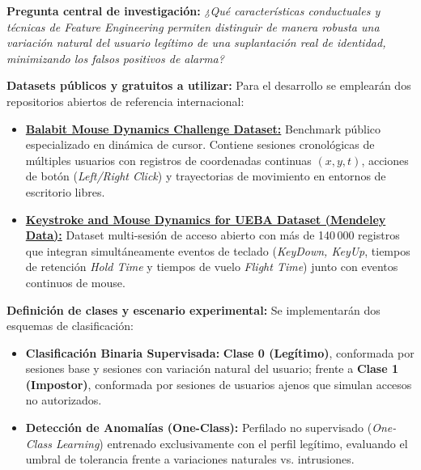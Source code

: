 \documentclass[10pt,letterpaper]{article}
\begin{document}
\textbf{Pregunta central de investigación:} \textit{¿Qué características conductuales y técnicas de Feature Engineering permiten distinguir de manera robusta una variación natural del usuario legítimo de una suplantación real de identidad, minimizando los falsos positivos de alarma?}

\textbf{Datasets públicos y gratuitos a utilizar:}
Para el desarrollo se emplearán dos repositorios abiertos de referencia internacional:
\begin{itemize}
    \item \href{https://github.com/balabit/Mouse-Dynamics-Challenge}{\textbf{Balabit Mouse Dynamics Challenge Dataset:}} Benchmark público especializado en dinámica de cursor. Contiene sesiones cronológicas de múltiples usuarios con registros de coordenadas continuas $(x, y, t)$, acciones de botón (\textit{Left/Right Click}) y trayectorias de movimiento en entornos de escritorio libres.
    \item \href{https://data.mendeley.com/datasets/f78jsh6zp9/2}{\textbf{Keystroke and Mouse Dynamics for UEBA Dataset (Mendeley Data):}} Dataset multi-sesión de acceso abierto con más de 140\,000 registros que integran simultáneamente eventos de teclado (\textit{KeyDown, KeyUp}, tiempos de retención \textit{Hold Time} y tiempos de vuelo \textit{Flight Time}) junto con eventos continuos de mouse.
\end{itemize}

\textbf{Definición de clases y escenario experimental:} Se implementarán dos esquemas de clasificación:
\begin{itemize}
    \item \textbf{Clasificación Binaria Supervisada:} \textbf{Clase 0 (Legítimo)}, conformada por sesiones base y sesiones con variación natural del usuario; frente a \textbf{Clase 1 (Impostor)}, conformada por sesiones de usuarios ajenos que simulan accesos no autorizados.
    \item \textbf{Detección de Anomalías (One-Class):} Perfilado no supervisado (\textit{One-Class Learning}) entrenado exclusivamente con el perfil legítimo, evaluando el umbral de tolerancia frente a variaciones naturales vs. intrusiones.
\end{itemize}
\end{document}
